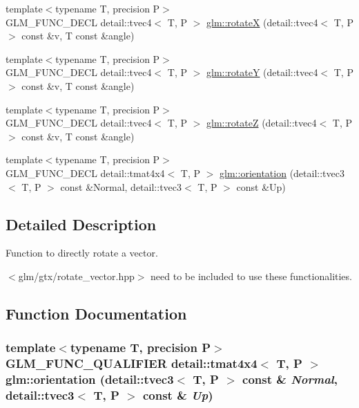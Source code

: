 \begin{CompactItemize}
\item 
{\footnotesize template$<$typename T, precision P$>$ }\\GLM\_\-FUNC\_\-DECL detail::tvec4$<$ T, P $>$ \hyperlink{group__gtx__rotate__vector_g846674e399c4106196405900ce78fe27}{glm::rotateX} (detail::tvec4$<$ T, P $>$ const \&v, T const \&angle)
\item 
{\footnotesize template$<$typename T, precision P$>$ }\\GLM\_\-FUNC\_\-DECL detail::tvec4$<$ T, P $>$ \hyperlink{group__gtx__rotate__vector_g8e90d477a21ac9e17a8b764eac6d0999}{glm::rotateY} (detail::tvec4$<$ T, P $>$ const \&v, T const \&angle)
\item 
{\footnotesize template$<$typename T, precision P$>$ }\\GLM\_\-FUNC\_\-DECL detail::tvec4$<$ T, P $>$ \hyperlink{group__gtx__rotate__vector_g4505b3c64cf26afba934ad1f65c5f792}{glm::rotateZ} (detail::tvec4$<$ T, P $>$ const \&v, T const \&angle)
\item 
{\footnotesize template$<$typename T, precision P$>$ }\\GLM\_\-FUNC\_\-DECL detail::tmat4x4$<$ T, P $>$ \hyperlink{group__gtx__rotate__vector_g6388a91274507ab81224d8f5d434875e}{glm::orientation} (detail::tvec3$<$ T, P $>$ const \&Normal, detail::tvec3$<$ T, P $>$ const \&Up)
\end{CompactItemize}


\subsection{Detailed Description}
Function to directly rotate a vector. 

$<$glm/gtx/rotate\_\-vector.hpp$>$ need to be included to use these functionalities. 

\subsection{Function Documentation}
\hypertarget{group__gtx__rotate__vector_g6388a91274507ab81224d8f5d434875e}{
\subsubsection[orientation]{\setlength{\rightskip}{0pt plus 5cm}template$<$typename T, precision P$>$ GLM\_\-FUNC\_\-QUALIFIER detail::tmat4x4$<$ T, P $>$ glm::orientation (detail::tvec3$<$ T, P $>$ const \& {\em Normal}, \/  detail::tvec3$<$ T, P $>$ const \& {\em Up})}}
\label{group__gtx__rotate__vector_g6388a91274507ab81224d8f5d434875e}


